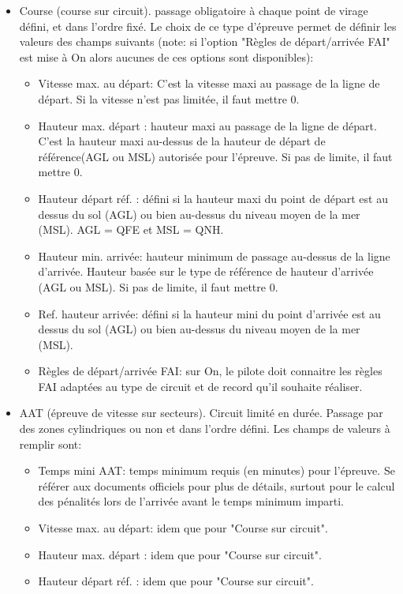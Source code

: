 \begin{itemize}
\item Course (course sur circuit).  passage obligatoire à chaque point de virage défini, et dans l'ordre fixé. Le choix de ce type d'épreuve permet de définir les valeurs des champs suivants (note: si l'option "Règles de départ/arrivée FAI" est mise à On alors aucunes de ces options sont disponibles):
  \begin{itemize}
  \item Vitesse max. au départ: C'est la vitesse maxi au passage de la ligne de départ. Si la vitesse n'est pas limitée, il faut mettre 0.
  \item Hauteur max. départ : hauteur maxi au passage de la ligne de départ. C'est la hauteur maxi au-dessus de la hauteur de départ de référence(AGL ou MSL) autorisée pour l'épreuve. Si pas de limite, il faut mettre 0.
  \item Hauteur départ réf. : défini si la hauteur maxi du point de départ est au dessus du sol (AGL) ou bien au-dessus du niveau moyen de la mer (MSL). AGL = QFE et MSL = QNH.
  \item Hauteur min. arrivée: hauteur minimum de passage au-dessus de la ligne d'arrivée. Hauteur basée sur le type de référence de hauteur d'arrivée (AGL ou MSL). Si pas de limite, il faut mettre 0.
  \item Ref. hauteur arrivée: défini si la hauteur mini du point d'arrivée est au dessus du sol (AGL) ou bien au-dessus du niveau moyen de la mer (MSL).
  \item Règles de départ/arrivée FAI: sur On, le pilote doit connaitre les règles FAI adaptées au type de circuit et de record qu'il souhaite réaliser.
  \end{itemize}
\item AAT (épreuve de vitesse sur secteurs). Circuit limité en durée. Passage par des zones cylindriques ou non et dans l'ordre défini. Les champs de valeurs à remplir sont:
  \begin{itemize}
  \item Temps mini AAT: temps minimum requis (en minutes) pour l'épreuve. Se référer aux documents officiels pour plus de détails, surtout pour le calcul des pénalités lors de l'arrivée avant le temps minimum imparti.
  \item Vitesse max. au départ: idem que pour "Course sur circuit".
  \item Hauteur max. départ : idem que pour "Course sur circuit".
  \item Hauteur départ réf. : idem que pour "Course sur circuit".

\end{itemize}
\end{itemize}
